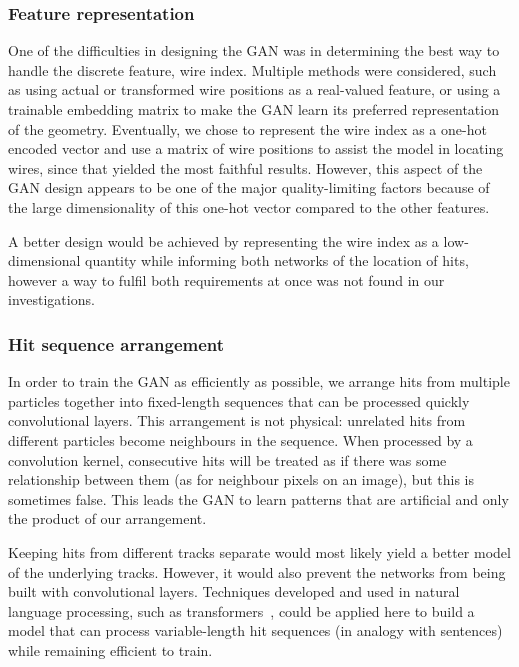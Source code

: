 \subsubsection{Feature representation}
One of the difficulties in designing the GAN was in determining the best way to
handle the discrete feature, wire index. Multiple methods were considered, such
as using actual or transformed wire positions as a real-valued feature, or using
a trainable embedding matrix to make the GAN learn its preferred representation
of the geometry. Eventually, we chose to represent the wire index as a one-hot
encoded vector and use a matrix of wire positions to assist the model in
locating wires, since that yielded the most faithful results. However, this
aspect of the GAN design appears to be one of the major quality-limiting factors
because of the large dimensionality of this one-hot vector compared to the other
features. 

A better design would be achieved by representing the wire index as a
low-dimensional quantity while informing both networks of the location of hits,
however a way to fulfil both requirements at once was not found in our
investigations.

\subsubsection{Hit sequence arrangement}

In order to train the GAN as efficiently as possible, we arrange hits from
multiple particles together into fixed-length sequences that can be processed
quickly convolutional layers. This arrangement is not physical: unrelated hits
from different particles become neighbours in the sequence. When processed by a
convolution kernel, consecutive hits will be treated as if there was some
relationship between them (as for neighbour pixels on an image), but this is
sometimes false. This leads the GAN to learn patterns that are artificial and
only the product of our arrangement. 

Keeping hits from different tracks separate would most likely yield a better
model of the underlying tracks. However, it would also prevent the networks from
being built with convolutional layers. Techniques developed and used in natural
language processing, such as transformers~\cite{10.5555/3295222.3295349}, could
be applied here to build a model that can process variable-length hit sequences
(in analogy with sentences) while remaining efficient to train.


